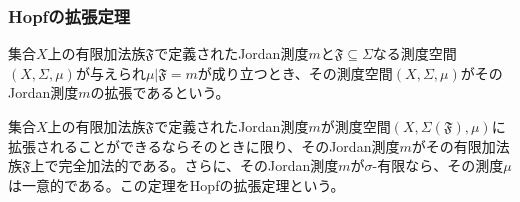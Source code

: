 \documentclass[dvipdfmx]{jsarticle}
\begin{document}
\subsubsection{Hopfの拡張定理}%
\begin{dfn}
集合$X$上の有限加法族$\mathfrak{F}$で定義されたJordan測度$m$と$\mathfrak{F \subseteq}\varSigma$なる測度空間$(X,\varSigma,\mu)$が与えられ$\mu|\mathfrak{F} =m$が成り立つとき、その測度空間$(X,\varSigma,\mu)$がそのJordan測度$m$の拡張であるという。
\end{dfn}
\begin{thm}[Hopfの拡張定理]\label{4.5.3.27}
集合$X$上の有限加法族$\mathfrak{F}$で定義されたJordan測度$m$が測度空間$\left( X,\varSigma\left( \mathfrak{F} \right),\mu \right)$に拡張されることができるならそのときに限り、そのJordan測度$m$がその有限加法族$\mathfrak{F}$上で完全加法的である。さらに、そのJordan測度$m$が$\sigma$-有限なら、その測度$\mu$は一意的である。この定理をHopfの拡張定理という。
\end{thm}
\end{document}
